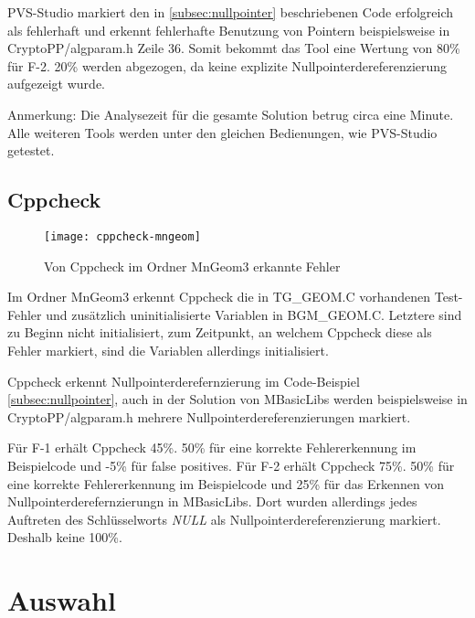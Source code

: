PVS-Studio markiert den in \ref{subsec:nullpointer} beschriebenen Code erfolgreich als fehlerhaft und erkennt fehlerhafte Benutzung von Pointern beispielsweise in
\glqq{}CryptoPP/algparam.h\grqq{} Zeile 36. Somit bekommt das Tool eine Wertung von 80\% für F-2. 20\% werden abgezogen, da keine explizite Nullpointerdereferenzierung
aufgezeigt wurde.

Anmerkung: Die Analysezeit für die gesamte Solution betrug circa eine Minute. \newline
Alle weiteren Tools werden unter den gleichen Bedienungen, wie PVS-Studio getestet.

\subsection{Cppcheck}

\begin{figure}[htpb]
  \centering
  \texttt{[image: cppcheck-mngeom]}
  \caption{Von Cppcheck im Ordner MnGeom3 erkannte Fehler}
  \label{img:cppcheck-mngeom}
\end{figure}

Im Ordner \glqq{}MnGeom3\grqq{} erkennt Cppcheck die in \glqq{}TG\_GEOM.C\grqq{} vorhandenen Test-Fehler und zusätzlich uninitialisierte Variablen in \glqq{}BGM\_GEOM.C\grqq{}. Letztere
sind zu Beginn nicht initialisiert, zum Zeitpunkt, an welchem Cppcheck diese als Fehler markiert, sind die Variablen allerdings initialisiert. \newline

Cppcheck erkennt Nullpointerderefernzierung im Code-Beispiel \ref{subsec:nullpointer}, auch in der Solution von MBasicLibs werden beispielsweise in \glqq{}CryptoPP/algparam.h\grqq{}
mehrere Nullpointerdereferenzierungen markiert.

Für F-1 erhält Cppcheck 45\%. 50\% für eine korrekte Fehlererkennung im Beispielcode und -5\% für false positives. \newline
Für F-2 erhält Cppcheck 75\%. 50\% für eine korrekte Fehlererkennung im Beispielcode und 25\% für das Erkennen von Nullpointerderefernzierungn in MBasicLibs. Dort wurden allerdings
jedes Auftreten des Schlüsselworts \textit{NULL} als Nullpointerdereferenzierung markiert. Deshalb keine 100\%.

\section{Auswahl}
\label{sec:auswahl}

